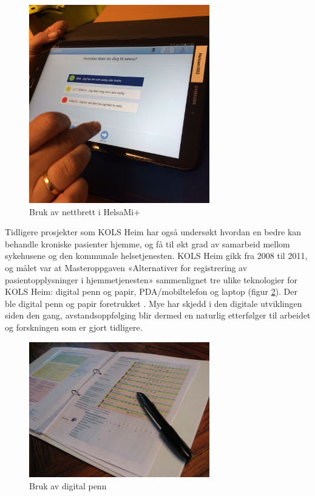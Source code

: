 \begin{figure}
\includegraphics[width=0.7\textwidth,center]{fig/intro_helsami}
\caption{Bruk av nettbrett i HelsaMi+}
\label{fig:intro_helsami}
\end{figure}

Tidligere prosjekter som KOLS Heim har også undersøkt hvordan en bedre kan behandle kroniske pasienter hjemme, og få til økt grad
av samarbeid mellom sykehusene og den kommunale helsetjenesten. KOLS Heim gikk fra 2008 til 2011,
og målet var at  Masteroppgaven «Alternativer for registrering av
pasientopplysninger i hjemmetjenesten» sammenlignet tre ulike teknologier for KOLS Heim: digital penn og papir, PDA/mobiltelefon
og laptop (figur  \ref{fig:intro_gammelkols}).
Der ble digital penn og papir foretrukket \citep{kols_solberg}. Mye har skjedd i den digitale utviklingen siden den gang,
avstandsoppfølging blir dermed en naturlig etterfølger til arbeidet og forskningen som er gjort tidligere.

\begin{figure}
\includegraphics[width=0.7\textwidth,center]{fig/intro_gammelkols}
\caption{Bruk av digital penn \citep{kols_solberg}}
\label{fig:intro_gammelkols}
\end{figure}

